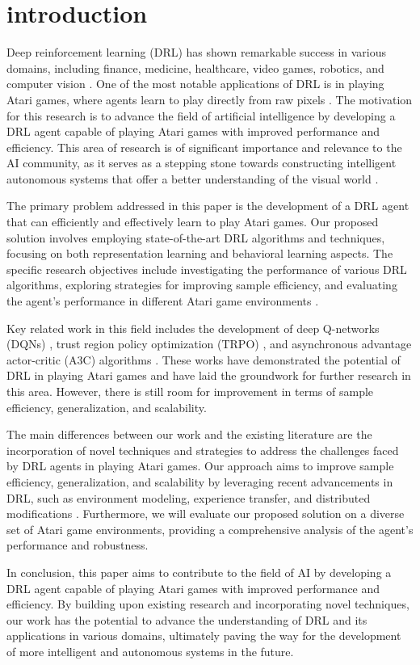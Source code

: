 \section{introduction}
Deep reinforcement learning (DRL) has shown remarkable success in various domains, including finance, medicine, healthcare, video games, robotics, and computer vision \cite{2108.11510}. One of the most notable applications of DRL is in playing Atari games, where agents learn to play directly from raw pixels \cite{1708.05866}. The motivation for this research is to advance the field of artificial intelligence by developing a DRL agent capable of playing Atari games with improved performance and efficiency. This area of research is of significant importance and relevance to the AI community, as it serves as a stepping stone towards constructing intelligent autonomous systems that offer a better understanding of the visual world \cite{1709.05067}.

The primary problem addressed in this paper is the development of a DRL agent that can efficiently and effectively learn to play Atari games. Our proposed solution involves employing state-of-the-art DRL algorithms and techniques, focusing on both representation learning and behavioral learning aspects. The specific research objectives include investigating the performance of various DRL algorithms, exploring strategies for improving sample efficiency, and evaluating the agent's performance in different Atari game environments \cite{2212.00253}.

Key related work in this field includes the development of deep Q-networks (DQNs) \cite{1708.05866}, trust region policy optimization (TRPO) \cite{1708.05866}, and asynchronous advantage actor-critic (A3C) algorithms \cite{1709.05067}. These works have demonstrated the potential of DRL in playing Atari games and have laid the groundwork for further research in this area. However, there is still room for improvement in terms of sample efficiency, generalization, and scalability.

The main differences between our work and the existing literature are the incorporation of novel techniques and strategies to address the challenges faced by DRL agents in playing Atari games. Our approach aims to improve sample efficiency, generalization, and scalability by leveraging recent advancements in DRL, such as environment modeling, experience transfer, and distributed modifications \cite{2212.00253}. Furthermore, we will evaluate our proposed solution on a diverse set of Atari game environments, providing a comprehensive analysis of the agent's performance and robustness.

In conclusion, this paper aims to contribute to the field of AI by developing a DRL agent capable of playing Atari games with improved performance and efficiency. By building upon existing research and incorporating novel techniques, our work has the potential to advance the understanding of DRL and its applications in various domains, ultimately paving the way for the development of more intelligent and autonomous systems in the future. 